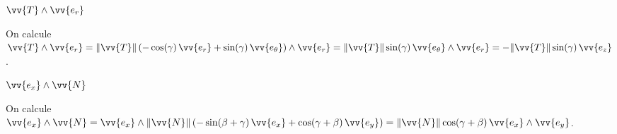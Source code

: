 
\begin{enonce}
$\vv{T} \wedge \vv{e_r}$
\end{enonce}



\begin{corrige}
On calcule $
\vv{T} \wedge \vv{e_r}
	= \Arrowvert\vv{T}\Arrowvert\left(
		-\cos(\gamma)\,\vv{e_r} + \sin(\gamma)\,\vv{e_\theta}\right)
		\wedge
		\vv{e_r}
	= \Arrowvert\vv{T}\Arrowvert
		\sin(\gamma)\,\vv{e_\theta}\wedge\vv{e_r}
	= -\Arrowvert\vv{T}\Arrowvert\sin(\gamma)
	\,\vv{e_z}
$.
\end{corrige}




\begin{enonce}
$\vv{e_x} \wedge \vv{N}$
\end{enonce}


\begin{corrige}
On calcule $
\vv{e_x} \wedge \vv{N}
	= \vv{e_x} \wedge
	\Arrowvert\vv{N}\Arrowvert\left(
		-\sin(\beta+\gamma)\,\vv{e_x} + \cos(\gamma+\beta)\,\vv{e_y}
	\right)
	= \Arrowvert\vv{N}\Arrowvert
		\cos(\gamma+\beta)\,\vv{e_x}\wedge\vv{e_y}
$.
\end{corrige}


\finEntrainement







\hauteurLargeurCadreReponse		{17mm}{1.8cm}
\initialisationEntrainement

